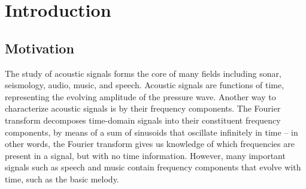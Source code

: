 \documentclass[letter,12pt,notitlepage]{article}
\title{\ThesisTitle}
\author{\vspace{1em}\\Sevag Hanssian \\
  McGill University \\
 \small{\texttt{sevag.hanssian@mail.mcgill.ca}} \\
 \small{\texttt{sevagh@protonmail.com}} \\\ \\\ \\
 \small{Thesis for Master of Arts in Music Technology}\\
 \small{Date TBD, 2021}}
\date{}
\begin{document}
\maketitle

\vspace{3.5em}

\begin{abstract}
	The short-time Fourier transform (STFT) is an important tool for the time-frequency analysis of acoustic signals. The STFT is commonly used as the input representation of music signals in deep learning models. Examples of music information retrieval (MIR) tasks where such models have achieved success are onset detection, beat tracking, and music source separation. Despite its ubiquity, the STFT has a fixed and bounded time-frequency resolution, such that one must sacrifice time for frequency resolution (or vice versa) by changing the window size. The Nonstationary Gabor Transform (NSGT) is an adaptive time-frequency transform which can vary its time-frequency resolution to better represent music signals. In this thesis, first the STFT and NSGT are described as tools for representing and manipulating music signals. Next, the STFT is replaced with different configurations of the NSGT in deep learning models for onset detection, beat tracking, and music source separation respectively, showing significant improvements in the results.
\end{abstract}

\vfill
\clearpage %

\tableofcontents

\vfill
\clearpage %

\listoffigures

\listoflistings

\vfill
\clearpage %

\section{Introduction}
\label{sec:intro}

\subsection{Motivation}

The study of acoustic signals forms the core of many fields including sonar, seismology, audio, music, and speech. Acoustic signals are functions of time, representing the evolving amplitude of the pressure wave. Another way to characterize acoustic signals is by their frequency components. The Fourier transform decomposes time-domain signals into their constituent frequency components, by means of a sum of sinusoids that oscillate infinitely in time -- in other words, the Fourier transform gives us knowledge of which frequencies are present in a signal, but with no time information. However, many important signals such as speech and music contain frequency components that evolve with time, such as the basic melody.
\end{document}
